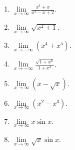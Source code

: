 \begin{multicols}{3}
\begin{enumerate}[ref={\fcProblemRef}]
\item $\displaystyle \lim\limits_{x\to\infty}\frac{x^4+x}{x^3-x+2}$.

\answer{$\infty$}
\item $\displaystyle \lim\limits_{x\to\infty}\sqrt{x^2+1}$.

\answer{$\infty$}
\item $\displaystyle \lim\limits_{x\to-\infty}(x^4+x^5)$.

\answer{$-\infty$}
\item $\displaystyle \lim\limits_{x\to-\infty}\frac{\sqrt{1+x^6}}{1+x^2}$.

\answer{$\infty$}
\item $\displaystyle \lim\limits_{x\to\infty}(x-\sqrt{x})$.

\answer{$\infty$}
\item $\displaystyle \lim\limits_{x\to\infty}(x^2-x^3)$.

\answer{$-\infty$}
\item $\displaystyle \lim\limits_{x\to\infty}x\sin x$.

\item $\displaystyle \lim\limits_{x\to\infty}\sqrt{x}\sin x$.

\end{enumerate}
\end{multicols}